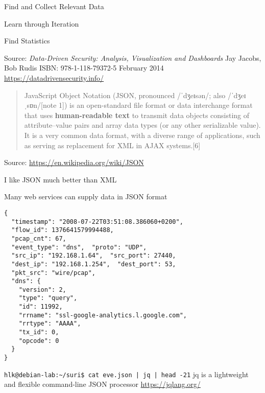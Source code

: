 \documentclass[Screen16to9,17pt]{foils}
\begin{document}

\begin{list2}
\item Find and Collect Relevant Data
\item Learn through Iteration
\item Find Statistics
\end{list2}
Source: \emph{Data-Driven Security: Analysis, Visualization and Dashboards} Jay Jacobs, Bob Rudis
ISBN: 978-1-118-79372-5 February 2014 \url{https://datadrivensecurity.info/}





\begin{quote}
JavaScript Object Notation (JSON, pronounced /ˈdʒeɪsən/; also /ˈdʒeɪˌsɒn/[note 1]) is an open-standard file format or data interchange format that uses {\bf human-readable text} to transmit data objects consisting of attribute–value pairs and array data types (or any other serializable value). It is a very common data format, with a diverse range of applications, such as serving as replacement for XML in AJAX systems.[6]
\end{quote}
Source: \url{https://en.wikipedia.org/wiki/JSON}

\begin{list2}
\item I like JSON much better than XML
\item Many web services can supply data in JSON format
\end{list2}




\begin{verbatim}
{
  "timestamp": "2008-07-22T03:51:08.386060+0200",
  "flow_id": 1376641579994488,
  "pcap_cnt": 67,
  "event_type": "dns",  "proto": "UDP",
  "src_ip": "192.168.1.64",  "src_port": 27440,
  "dest_ip": "192.168.1.254",  "dest_port": 53,
  "pkt_src": "wire/pcap",
  "dns": {
    "version": 2,
    "type": "query",
    "id": 11992,
    "rrname": "ssl-google-analytics.l.google.com",
    "rrtype": "AAAA",
    "tx_id": 0,
    "opcode": 0
  }
}
\end{verbatim}

\begin{list2}
\item
\verb+hlk@debian-lab:~/suri$ cat eve.json | jq | head -21+
jq is a lightweight and flexible command-line JSON processor \url{https://jqlang.org/}
\end{list2}
\end{document}
